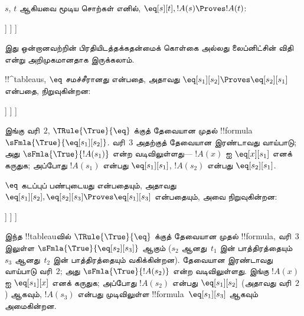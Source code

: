 \documentclass[../../../include/open-logic-section]{subfiles}
\begin{document}
\begin{ex}
$s$, $t$ ஆகியவை மூடிய சொற்கள் எனில், $\eq[s][t], !A(s)
\Proves !A(t)$:
\begin{oltableau}
  [\sFmla{\False}{\formula{A}(t)}, just = \TAss
    [\sFmla{\True}{\eq[s][t]}, just = \TAss
      [\sFmla{\True}{\formula{A}(s)}, just = \TAss
        [\sFmla{\True}{\formula{A}(t)}, just={\TRule{\True}{\eq}[2, 3]}, close]
      ]
    ]
  ]
\end{oltableau}
இது ஒன்றானவற்றின் பிரதியிடத்தக்கதன்மைக் கொள்கை அல்லது லைப்னிட்சின் விதி
என்று அறிமுகமானதாக இருக்கலாம்.

!!^{tableau}s, $\eq$ சமச்சீரானது என்பதை, அதாவது $\eq[s_1][s_2]
\Proves \eq[s_2][s_1]$ என்பதை, நிறுவுகின்றன:
\begin{oltableau}
  [\sFmla{\False}{\eq[s_2][s_1]}, just = \TAss
    [\sFmla{\True}{\eq[s_1][s_2]}, just = \TAss
      [\sFmla{\True}{\eq[s_1][s_1]}, just = {$\eq$}
        [\sFmla{\True}{\eq[s_2][s_1]}, just = {\TRule{\True}{\eq}[2, 3]}, close]
      ]
    ]
  ]
\end{oltableau}
இங்கு வரி~$2$, $\TRule{\True}{\eq}$ க்குத் தேவையான முதல்
!!{formula}~$\sFmla{\True}{\eq[s_1][s_2]}$. வரி~$3$ அதற்குத் தேவையான
இரண்டாவது வாய்பாடு; அது $\sFmla{\True}{!A(s_1)}$ என்ற வடிவிலுள்ளது—
$!A(x)$ ஐ $\eq[x][s_1]$ எனக் கருதுக; அப்போது $!A(s_1)$ என்பது
$\eq[s_1][s_1]$, $!A(s_2)$ என்பது $\eq[s_2][s_1]$.

$\eq$ கடப்புப் பண்புடையது என்பதையும், அதாவது $\eq[s_1][s_2],
\eq[s_2][s_3] \Proves \eq[s_1][s_3]$ என்பதையும், அவை நிறுவுகின்றன:
\begin{oltableau}
  [\sFmla{\False}{\eq[s_1][s_3]}, just = \TAss
    [\sFmla{\True}{\eq[s_1][s_2]}, just = \TAss
      [\sFmla{\True}{\eq[s_2][s_3]}, just = \TAss
        [\sFmla{\True}{\eq[s_1][s_3]}, just = {\TRule{\True}{\eq}[3, 2]}, close]
      ]
    ]
  ]
\end{oltableau}
இந்த !!{tableau}வில் $\TRule{\True}{\eq}$ க்குத் தேவையான முதல் !!{formula},
வரி~$3$ இலுள்ள $\sFmla{\True}{\eq[s_2][s_3]}$ ஆகும் ($s_2$ ஆனது~$t_1$
இன் பாத்திரத்தையும் $s_3$ ஆனது~$t_2$ இன் பாத்திரத்தையும் வகிக்கின்றன).
தேவையான இரண்டாவது வாய்பாடு வரி~$2$; அது
$\sFmla{\True}{!A(s_2)}$ என்ற வடிவிலுள்ளது. இங்கு $!A(x)$ ஐ
$\eq[s_1][x]$ எனக் கருதுக; அப்போது $!A(s_2)$ என்பது
$\eq[s_1][s_2]$ (அதாவது வரி~$2$) ஆகவும், $!A(s_3)$ என்பது முடிவிலுள்ள
!!{formula}~$\eq[s_1][s_3]$ ஆகவும் அமைகின்றன.
\end{ex}
\end{document}

